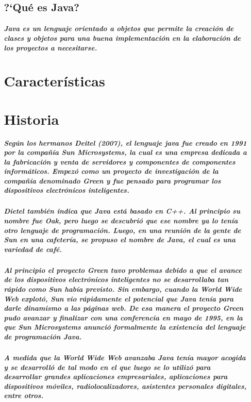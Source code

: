 \documentclass[12pt]{book} %
\begin{document}
\section{?`Qu\'e es Java?}
\paragraph{Java es un lenguaje orientado a objetos \cite{ob} que permite la creaci\'on de clases y objetos para una buena implementaci\'on en la elaboraci\'on de los proyectos a necesitarse.}
\chapter{Características}
\chapter{Historia}
\paragraph{Según los hermanos Deitel (2007), el lenguaje java fue creado en 1991 por la compañía Sun Microsystems, la cual es una empresa dedicada a la fabricación y venta de servidores y componentes de componentes informáticos. Empezó como un proyecto de investigación de la compañía denominado Green y fue pensado para programar los dispositivos electrónicos inteligentes.}
\paragraph{Dietel también indica que Java está basado en C++. Al principio su nombre fue Oak, pero luego se descubrió que ese nombre ya lo tenía otro lenguaje de programación. Luego, en una reunión de la gente de Sun en una cafetería, se propuso el nombre de Java, el cual es una variedad de café. }
\paragraph{Al principio el proyecto Green tuvo problemas debido a que el avance de los dispositivos electrónicos inteligentes no se desarrollaba tan rápido como Sun había previsto. Sin embargo, cuando la World Wide Web explotó, Sun vio rápidamente el potencial que Java tenía para darle dinamismo a las páginas web. De esa manera el proyecto Green pudo avanzar y finalizar con una conferencia en mayo de 1995, en la que Sun Microsystems anunció formalmente la existencia del lenguaje de programación Java. }
\paragraph{A medida que la World Wide Web avanzaba Java tenía mayor acogida y se desarrolló de tal modo en el que luego se lo utilizó para desarrollar grandes aplicaciones empresariales, aplicaciones para dispositivos móviles, radiolocalizadores, asistentes personales digitales, entre otros. }
\end{document}
